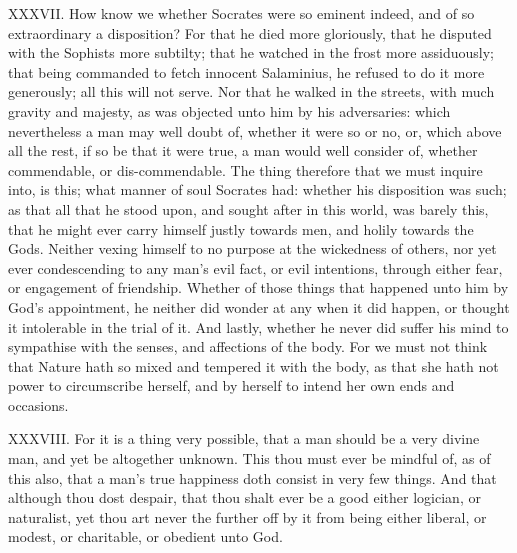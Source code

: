 XXXVII. How know we whether Socrates were so eminent indeed, and of so
extraordinary a disposition? For that he died more gloriously, that he
disputed with the Sophists more subtilty; that he watched in the frost
more assiduously; that being commanded to fetch innocent Salaminius, he
refused to do it more generously; all this will not serve. Nor that he
walked in the streets, with much gravity and majesty, as was objected unto
him by his adversaries: which nevertheless a man may well doubt of,
whether it were so or no, or, which above all the rest, if so be that it
were true, a man would well consider of, whether commendable, or
dis-commendable. The thing therefore that we must inquire into, is this;
what manner of soul Socrates had: whether his disposition was such; as
that all that he stood upon, and sought after in this world, was barely
this, that he might ever carry himself justly towards men, and holily
towards the Gods. Neither vexing himself to no purpose at the wickedness
of others, nor yet ever condescending to any man's evil fact, or evil
intentions, through either fear, or engagement of friendship. Whether of
those things that happened unto him by God's appointment, he neither did
wonder at any when it did happen, or thought it intolerable in the trial
of it. And lastly, whether he never did suffer his mind to sympathise with
the senses, and affections of the body. For we must not think that Nature
hath so mixed and tempered it with the body, as that she hath not power to
circumscribe herself, and by herself to intend her own ends and occasions.

XXXVIII. For it is a thing very possible, that a man should be a very
divine man, and yet be altogether unknown. This thou must ever be mindful
of, as of this also, that a man's true happiness doth consist in very few
things. And that although thou dost despair, that thou shalt ever be a
good either logician, or naturalist, yet thou art never the further off by
it from being either liberal, or modest, or charitable, or obedient unto
God.

